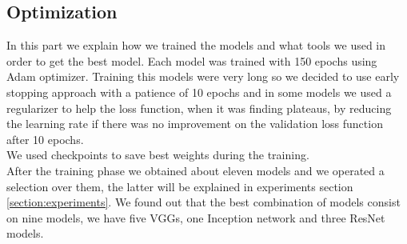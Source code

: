 \documentclass[10pt,twocolumn,letterpaper]{article}
\begin{document}
\subsection{Optimization}
In this part we explain how we trained the models and what tools we used in order to get the best model. Each model was trained with 150 epochs using Adam optimizer. Training this models were very long so we decided to use early stopping approach with a patience of 10 epochs and in some models we used a regularizer to help the loss function, when it was finding plateaus, by reducing the learning rate if there was no improvement on the validation loss function after 10 epochs.\\
We used checkpoints to save best weights during the training.\\
After the training phase we obtained about eleven models and we operated a selection over them, the latter will be explained in experiments section \ref{section:experiments}. We found out that the best combination of models consist on nine models, we have five VGGs, one Inception network and three ResNet models. 
\end{document}

